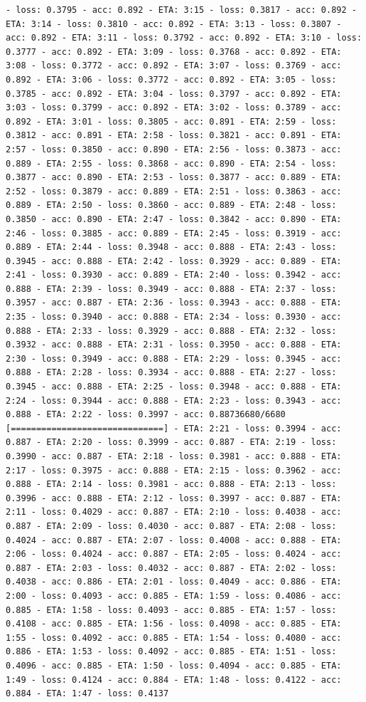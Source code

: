 \documentclass[11pt]{article}
\begin{document}
\begin{Verbatim}[commandchars=\\\{\}]
- loss: 0.3795 - acc: 0.892 - ETA: 3:15 - loss: 0.3817 - acc: 0.892 - ETA: 3:14 - loss: 0.3810 - acc: 0.892 - ETA: 3:13 - loss: 0.3807 - acc: 0.892 - ETA: 3:11 - loss: 0.3792 - acc: 0.892 - ETA: 3:10 - loss: 0.3777 - acc: 0.892 - ETA: 3:09 - loss: 0.3768 - acc: 0.892 - ETA: 3:08 - loss: 0.3772 - acc: 0.892 - ETA: 3:07 - loss: 0.3769 - acc: 0.892 - ETA: 3:06 - loss: 0.3772 - acc: 0.892 - ETA: 3:05 - loss: 0.3785 - acc: 0.892 - ETA: 3:04 - loss: 0.3797 - acc: 0.892 - ETA: 3:03 - loss: 0.3799 - acc: 0.892 - ETA: 3:02 - loss: 0.3789 - acc: 0.892 - ETA: 3:01 - loss: 0.3805 - acc: 0.891 - ETA: 2:59 - loss: 0.3812 - acc: 0.891 - ETA: 2:58 - loss: 0.3821 - acc: 0.891 - ETA: 2:57 - loss: 0.3850 - acc: 0.890 - ETA: 2:56 - loss: 0.3873 - acc: 0.889 - ETA: 2:55 - loss: 0.3868 - acc: 0.890 - ETA: 2:54 - loss: 0.3877 - acc: 0.890 - ETA: 2:53 - loss: 0.3877 - acc: 0.889 - ETA: 2:52 - loss: 0.3879 - acc: 0.889 - ETA: 2:51 - loss: 0.3863 - acc: 0.889 - ETA: 2:50 - loss: 0.3860 - acc: 0.889 - ETA: 2:48 - loss: 0.3850 - acc: 0.890 - ETA: 2:47 - loss: 0.3842 - acc: 0.890 - ETA: 2:46 - loss: 0.3885 - acc: 0.889 - ETA: 2:45 - loss: 0.3919 - acc: 0.889 - ETA: 2:44 - loss: 0.3948 - acc: 0.888 - ETA: 2:43 - loss: 0.3945 - acc: 0.888 - ETA: 2:42 - loss: 0.3929 - acc: 0.889 - ETA: 2:41 - loss: 0.3930 - acc: 0.889 - ETA: 2:40 - loss: 0.3942 - acc: 0.888 - ETA: 2:39 - loss: 0.3949 - acc: 0.888 - ETA: 2:37 - loss: 0.3957 - acc: 0.887 - ETA: 2:36 - loss: 0.3943 - acc: 0.888 - ETA: 2:35 - loss: 0.3940 - acc: 0.888 - ETA: 2:34 - loss: 0.3930 - acc: 0.888 - ETA: 2:33 - loss: 0.3929 - acc: 0.888 - ETA: 2:32 - loss: 0.3932 - acc: 0.888 - ETA: 2:31 - loss: 0.3950 - acc: 0.888 - ETA: 2:30 - loss: 0.3949 - acc: 0.888 - ETA: 2:29 - loss: 0.3945 - acc: 0.888 - ETA: 2:28 - loss: 0.3934 - acc: 0.888 - ETA: 2:27 - loss: 0.3945 - acc: 0.888 - ETA: 2:25 - loss: 0.3948 - acc: 0.888 - ETA: 2:24 - loss: 0.3944 - acc: 0.888 - ETA: 2:23 - loss: 0.3943 - acc: 0.888 - ETA: 2:22 - loss: 0.3997 - acc: 0.88736680/6680 [==============================] - ETA: 2:21 - loss: 0.3994 - acc: 0.887 - ETA: 2:20 - loss: 0.3999 - acc: 0.887 - ETA: 2:19 - loss: 0.3990 - acc: 0.887 - ETA: 2:18 - loss: 0.3981 - acc: 0.888 - ETA: 2:17 - loss: 0.3975 - acc: 0.888 - ETA: 2:15 - loss: 0.3962 - acc: 0.888 - ETA: 2:14 - loss: 0.3981 - acc: 0.888 - ETA: 2:13 - loss: 0.3996 - acc: 0.888 - ETA: 2:12 - loss: 0.3997 - acc: 0.887 - ETA: 2:11 - loss: 0.4029 - acc: 0.887 - ETA: 2:10 - loss: 0.4038 - acc: 0.887 - ETA: 2:09 - loss: 0.4030 - acc: 0.887 - ETA: 2:08 - loss: 0.4024 - acc: 0.887 - ETA: 2:07 - loss: 0.4008 - acc: 0.888 - ETA: 2:06 - loss: 0.4024 - acc: 0.887 - ETA: 2:05 - loss: 0.4024 - acc: 0.887 - ETA: 2:03 - loss: 0.4032 - acc: 0.887 - ETA: 2:02 - loss: 0.4038 - acc: 0.886 - ETA: 2:01 - loss: 0.4049 - acc: 0.886 - ETA: 2:00 - loss: 0.4093 - acc: 0.885 - ETA: 1:59 - loss: 0.4086 - acc: 0.885 - ETA: 1:58 - loss: 0.4093 - acc: 0.885 - ETA: 1:57 - loss: 0.4108 - acc: 0.885 - ETA: 1:56 - loss: 0.4098 - acc: 0.885 - ETA: 1:55 - loss: 0.4092 - acc: 0.885 - ETA: 1:54 - loss: 0.4080 - acc: 0.886 - ETA: 1:53 - loss: 0.4092 - acc: 0.885 - ETA: 1:51 - loss: 0.4096 - acc: 0.885 - ETA: 1:50 - loss: 0.4094 - acc: 0.885 - ETA: 1:49 - loss: 0.4124 - acc: 0.884 - ETA: 1:48 - loss: 0.4122 - acc: 0.884 - ETA: 1:47 - loss: 0.4137 
\end{Verbatim}
\end{document}
